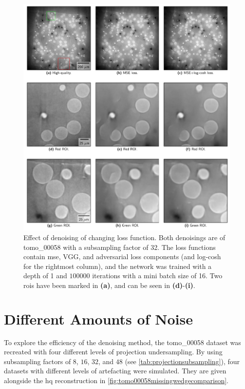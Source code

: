 \begin{figure}[htbp]
  \centering
  \includegraphics[width=.9\textwidth]{figures/losschangedenoisingcomparison.pdf}
  \caption[Effect on denoising of changing loss function]{Effect of denoising of changing loss function. Both denoisings are of tomo\_00058 with a subsampling factor of 32. The loss functions contain \gls{mse}, VGG, and adversarial loss components (and log-cosh for the rightmost column), and the network was trained with a depth of 1 and $100000$ iterations with a mini batch size of 16. Two \gls{roi}s have been marked in \textbf{(a)}, and can be seen in \textbf{(d)}-\textbf{(i)}. }
  \label{fig:losschangedenoisingcomparison}
\end{figure}



\section{Different Amounts of Noise}
To explore the efficiency of the denoising method, the tomo\_00058 dataset was recreated with four different levels of projection undersampling. By using subsampling factors of $8$, $16$, $32$, and $48$ (see \cref{tab:projectionsubsampling}), four datasets with different levels of artefacting were simulated. They are given alongside the \gls{hq} reconstruction in \cref{fig:tomo00058missingwedgecomparison}. 

